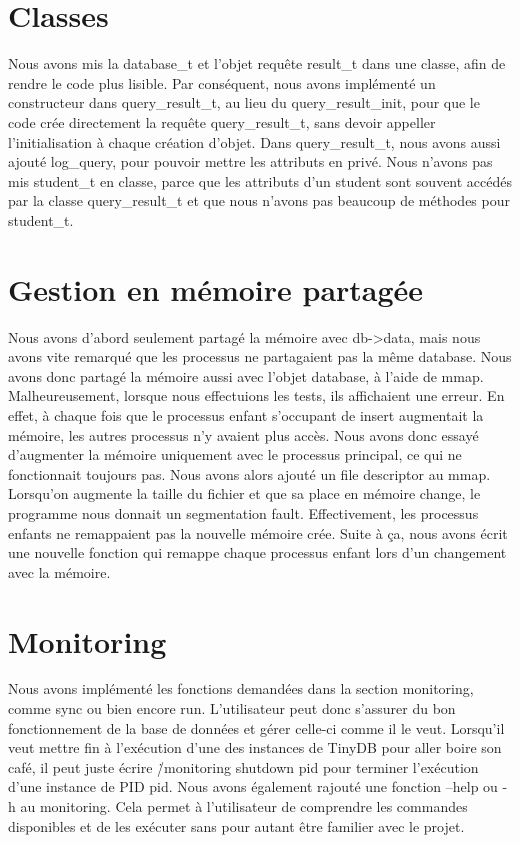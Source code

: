 \documentclass[utf8]{article}
\begin{document}
\section{Classes}
\indent{}
\par
Nous avons mis la database\_t et l'objet requête result\_t dans une classe, afin de rendre le code plus lisible. Par conséquent,
nous avons implémenté un constructeur dans query\_result\_t, au lieu du query\_result\_init, pour que le code
crée directement la requête query\_result\_t, sans devoir appeller l'initialisation à chaque création d'objet.
Dans query\_result\_t, nous avons aussi ajouté log\_query, pour pouvoir mettre les attributs en privé.
Nous n'avons pas mis student\_t en classe, parce que les attributs d'un student sont souvent accédés par la classe query\_result\_t
et que nous n'avons pas beaucoup de méthodes pour student\_t.
\par

\section{Gestion en mémoire partagée}
\indent{}
\par
Nous avons d'abord seulement partagé la mémoire avec db->data, mais nous avons vite remarqué que les processus
ne partagaient pas la même database. Nous avons donc partagé la mémoire aussi avec l'objet database, à l'aide de mmap.
Malheureusement, lorsque nous effectuions les tests, ils affichaient une erreur. En effet, à chaque fois que le processus enfant
s'occupant de insert augmentait la mémoire, les autres processus n'y avaient plus accès. Nous avons donc essayé d'augmenter la mémoire 
uniquement avec le processus principal, ce qui ne fonctionnait toujours pas. Nous avons alors ajouté un file descriptor au mmap.
Lorsqu'on augmente la taille du fichier et que sa place en mémoire change, le programme nous donnait un segmentation fault.
Effectivement, les processus enfants ne remappaient pas la nouvelle mémoire crée. Suite à ça, nous avons écrit une nouvelle fonction
qui remappe chaque processus enfant lors d'un changement avec la mémoire.
\par
\newpage
\section{Monitoring}
\indent{}
\par
Nous avons implémenté les fonctions demandées dans la section monitoring, comme sync ou bien encore run.
L'utilisateur peut donc s'assurer du bon fonctionnement de la base de données et gérer celle-ci comme il le veut. Lorsqu'il veut mettre fin à l'exécution d'une des instances de TinyDB pour aller boire son café, il peut juste écrire \./monitoring shutdown pid
pour terminer l'exécution d'une instance de PID pid.\newline
Nous avons également rajouté une fonction --help ou -h au monitoring. 
Cela permet à l'utilisateur de comprendre les commandes disponibles et de les exécuter sans pour autant être familier avec le projet.
\par
\end{document}
